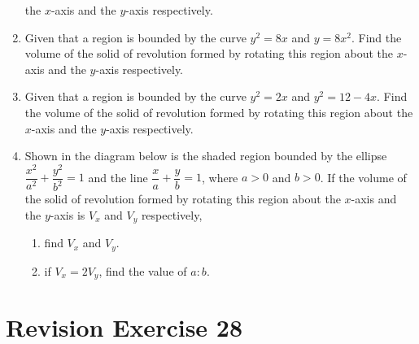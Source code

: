 \documentclass{report}
\begin{document}
\begin{enumerate}[resume]
          the $x$-axis and the $y$-axis respectively.
    \item Given that a region is bounded by the curve $y^2=8 x$ and $y=8 x^2$. Find the
          volume of the solid of revolution formed by rotating this region about the
          $x$-axis and the $y$-axis respectively.
    \item Given that a region is bounded by the curve $y^2=2 x$ and $y^2=12-4 x$. Find
          the volume of the solid of revolution formed by rotating this region about the
          $x$-axis and the $y$-axis respectively.
    \item Shown in the diagram below is the shaded region bounded by the ellipse
          $\dfrac{x^2}{a^2} + \dfrac{y^2}{b^2} = 1$ and the line $\dfrac{x}{a} +
              \dfrac{y}{b} = 1$, where $a > 0$ and $b > 0$. If the volume of the solid of
          revolution formed by rotating this region about the $x$-axis and the $y$-axis
          is $V_x$ and $V_y$ respectively,
          \begin{enumerate}
              \item find $V_x$ and $V_y$.
              \item if $V_x = 2V_y$, find the value of $a:b$.
          \end{enumerate}

\end{enumerate}

\section{Revision Exercise 28}
\end{document}
